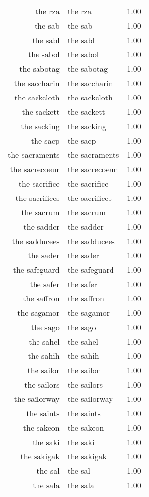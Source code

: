 \begin{table}[ht]
\begin{tabular}{rlr}
  the rza & the rza & 1.00 \\ 
  the sab & the sab & 1.00 \\ 
  the sabl & the sabl & 1.00 \\ 
  the sabol & the sabol & 1.00 \\ 
  the sabotag & the sabotag & 1.00 \\ 
  the saccharin & the saccharin & 1.00 \\ 
  the sackcloth & the sackcloth & 1.00 \\ 
  the sackett & the sackett & 1.00 \\ 
  the sacking & the sacking & 1.00 \\ 
  the sacp & the sacp & 1.00 \\ 
  the sacraments & the sacraments & 1.00 \\ 
  the sacrecoeur & the sacrecoeur & 1.00 \\ 
  the sacrifice & the sacrifice & 1.00 \\ 
  the sacrifices & the sacrifices & 1.00 \\ 
  the sacrum & the sacrum & 1.00 \\ 
  the sadder & the sadder & 1.00 \\ 
  the sadducees & the sadducees & 1.00 \\ 
  the sader & the sader & 1.00 \\ 
  the safeguard & the safeguard & 1.00 \\ 
  the safer & the safer & 1.00 \\ 
  the saffron & the saffron & 1.00 \\ 
  the sagamor & the sagamor & 1.00 \\ 
  the sago & the sago & 1.00 \\ 
  the sahel & the sahel & 1.00 \\ 
  the sahih & the sahih & 1.00 \\ 
  the sailor & the sailor & 1.00 \\ 
  the sailors & the sailors & 1.00 \\ 
  the sailorway & the sailorway & 1.00 \\ 
  the saints & the saints & 1.00 \\ 
  the sakeon & the sakeon & 1.00 \\ 
  the saki & the saki & 1.00 \\ 
  the sakigak & the sakigak & 1.00 \\ 
  the sal & the sal & 1.00 \\ 
  the sala & the sala & 1.00 \\ 

\end{tabular}
\end{table}
